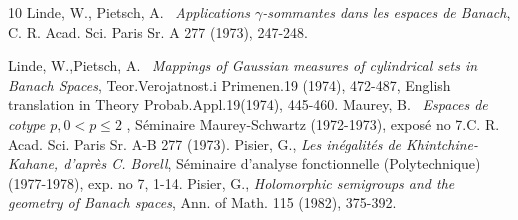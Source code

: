 \documentclass{smfart}
\theoremstyle{plain}
\theoremstyle{definition}
\begin{document}
\begin{thebibliography}{10}
 Linde, W., Pietsch, A. \  {\it  Applications $\gamma$-sommantes dans les espaces de Banach}, C. R. Acad. Sci. Paris Sr. A 277 (1973), 247-248.
 
 Linde, W.,Pietsch, A. \  {\it  Mappings of Gaussian measures of cylindrical sets in Banach Spaces}, Teor.Verojatnost.i Primenen.19 (1974), 472-487, English translation in Theory Probab.Appl.19(1974), 445-460. 
 Maurey, B.  \ {\it Espaces de cotype $p, 0 < p \le 2$ }, Séminaire Maurey-Schwartz (1972-1973), exposé no 7.C. R. Acad. Sci. Paris Sr. A-B 277 (1973).
 Pisier, G., {\it Les inégalités de Khintchine-Kahane, d'après C. Borell}, Séminaire d'analyse fonctionnelle (Polytechnique) (1977-1978), exp. no 7, 1-14.
 Pisier, G., {\it Holomorphic semigroups and the geometry of Banach spaces}, Ann. of Math. 115 (1982), 375-392.

\end{thebibliography}
\end{document}

